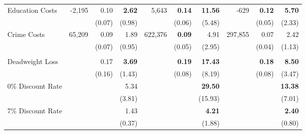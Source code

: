 \begin{tabular}{l r r r r r r r r r}
Education Costs	&	-2,195	&	0.10	&	\textbf{2.62}	&	5,643	&	\textbf{0.14}	&	\textbf{11.56}	&	-629	&	\textbf{0.12}	&	\textbf{5.70}	\\
	&		&	(0.07)	&	(0.98)	&		&	(0.06)	&	(5.48)	&		&	(0.05)	&	(2.33)	\\
Crime Costs	&	65,209	&	0.09	&	1.89	&	622,376	&	\textbf{0.09}	&	4.91	&	297,855	&	0.07	&	2.42	\\
	&		&	(0.07)	&	(0.95)	&		&	(0.05)	&	(2.95)	&		&	(0.04)	&	(1.13)	\\ \\
Deadweight Loss	&		&	0.17	&	\textbf{3.69}	&		&	\textbf{0.19}	&	\textbf{17.43}	&		&	\textbf{0.18}	&	\textbf{8.50}	\\
	&		&	(0.16)	&	(1.43)	&		&	(0.08)	&	(8.19)	&		&	(0.08)	&	(3.47)	\\
0\% Discount Rate	&		&		&	5.34	&		&		&	\textbf{29.50}	&		&		&	\textbf{13.38}	\\
	&		&		&	(3.81)	&		&		&	(15.93)	&		&		&	(7.01)	\\
7\% Discount Rate	&		&		&	1.43	&		&		&	\textbf{4.21}	&		&		&	\textbf{2.40}	\\
	&		&		&	(0.37)	&		&		&	(1.88)	&		&		&	(0.80)	\\

\bottomrule																			
\end{tabular}																			
